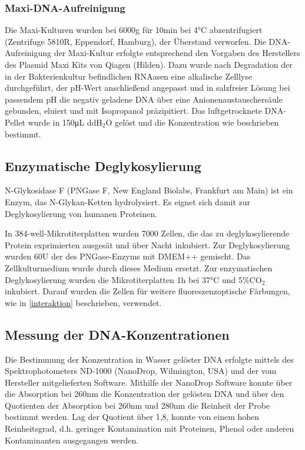 \subsubsection{Maxi-DNA-Aufreinigung}
Die Maxi-Kulturen wurden bei 6000g für 10\si{\minute} bei 4\si{\celsius} abzentrifugiert (Zentrifuge 5810R, Eppendorf, Hamburg), der Überstand verworfen.
Die DNA-Aufreinigung der Maxi-Kultur erfolgte entsprechend den Vorgaben des Herstellers des Plasmid Maxi Kits von Qiagen (Hilden). Dazu wurde nach Degradation der in der Bakterienkultur befindlichen RNAasen eine alkalische Zelllyse durchgeführt, der pH-Wert anschließend angepasst und in salzfreier Lösung bei passendem pH die negativ geladene DNA über eine Anionenaustauschersäule gebunden, eluiert und mit Isopropanol präzipitiert. Das luftgetrocknete DNA-Pellet wurde in 150\si{\micro\liter} ddH$_2$O gelöst und die Konzentration wie beschrieben bestimmt. 

\subsection{Enzymatische Deglykosylierung}
N-Glykosidase F (PNGase F, New England Biolabs, Frankfurt am Main) ist ein Enzym, das N-Glykan-Ketten hydrolysiert. Es eignet sich damit zur Deglykosylierung von humanen Proteinen.

 In 384-well-Mikrotiterplatten wurden 7000 Zellen, die das zu deglykosylierende Protein exprimierten ausgesät und über Nacht inkubiert. Zur Deglykosylierung wurden 60U der des PNGase-Enzyms mit DMEM++ gemischt. Das Zellkulturmedium wurde durch dieses Medium ersetzt. Zur enzymatischen Deglykosylierung wurden die Mikrotiterplatten 1\si{\hour} bei 37\si{\celsius} und 5\%CO$_2$ inkubiert. Darauf wurden die Zellen für weitere fluoreszenzoptische Färbungen, wie in \ref{interaktion} beschrieben, verwendet.
 
\subsection{Messung der DNA-Konzentrationen}
Die Bestimmung der Konzentration in Wasser gelöster DNA erfolgte mittels des Spektrophotometers ND-1000 (NanoDrop, Wilmington, USA) und der vom Hersteller mitgelieferten Software. Mithilfe der NanoDrop Software konnte über die Absorption bei 260\si{\nano\meter} die Konzentration der gelösten DNA und über den Quotienten der Absorption bei 260\si{\nano\meter} und 280\si{\nano\meter} die Reinheit der Probe bestimmt werden. Lag der Quotient über 1,8, konnte von einem hohen Reinheitsgrad, d.h. geringer Kontamination mit Proteinen, Phenol oder anderen Kontaminanten ausgegangen werden.

